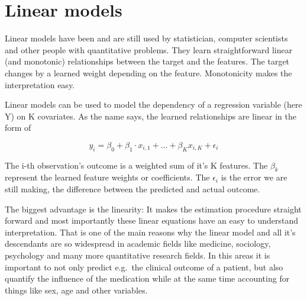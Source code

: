 \documentclass[12pt,]{krantz}
\theoremstyle{definition}
\theoremstyle{definition}
\theoremstyle{definition}
\theoremstyle{remark}
\begin{document}
\section{Linear models}\label{limo}

Linear models have been and are still used by statistician, computer
scientists and other people with quantitative problems. They learn
straightforward linear (and monotonic) relationships between the target
and the features. The target changes by a learned weight depending on
the feature. Monotonicity makes the interpretation easy.

Linear models can be used to model the dependency of a regression
variable (here Y) on K covariates. As the name says, the learned
relationships are linear in the form of

\[y_{i} = \beta_{0} + \beta_{1} \cdot x_{i,1} + \ldots + \beta_{K} x_{i,K} + \epsilon_{i}\]

The i-th observation's outcome is a weighted sum of it's K features. The
\(\beta_{k}\) represent the learned feature weights or coefficients. The
\(\epsilon_{i}\) is the error we are still making, the difference
between the predicted and actual outcome.

The biggest advantage is the linearity: It makes the estimation
procedure straight forward and most importantly these linear equations
have an easy to understand interpretation. That is one of the main
reasons why the linear model and all it's descendants are so widespread
in academic fields like medicine, sociology, psychology and many more
quantitative research fields. In this areas it is important to not only
predict e.g.~the clinical outcome of a patient, but also quantify the
influence of the medication while at the same time accounting for things
like sex, age and other variables.
\end{document}
